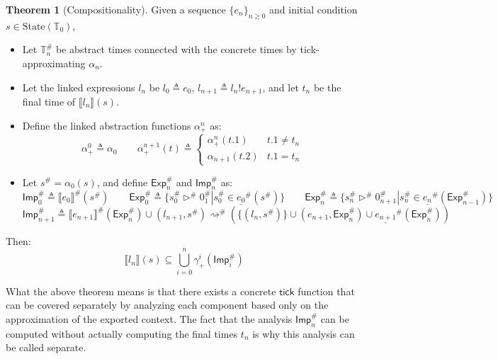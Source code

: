 \documentclass[acmsmall,review]{acmart}\settopmatter{printfolios=true,printccs=false,printacmref=false}
\theoremstyle{definition}
\newtheorem{thm}{Theorem}[section]
\newcommand*{\A}[1]{{#1}^{\#}}
\newcommand*{\Time}{\mathbb{T}}
\newcommand*{\ATime}{\A{\Time}}
\newcommand*{\State}[1]{\text{State}({#1})}
\newcommand*{\link}[2]{{#1}\mathtt{!}{#2}}
\newcommand*{\Exp}{\mathsf{Exp}}
\newcommand*{\Imp}{\mathsf{Imp}}
\newcommand*{\sembracket}[1]{\lBrack{#1}\rBrack}
\newcommand*{\tick}{\mathsf{tick}}
\begin{document}
\begin{thm}[Compositionality]
  Given a sequence $\{e_n\}_{n\ge 0}$ and initial condition $s\in\State{\Time_0}$,

  \begin{itemize}
    \item Let $\ATime_n$ be abstract times connected with the concrete times by tick-approximating $\alpha_n$.
    \item Let the linked expressions $l_n$ be $l_0\triangleq e_0$, $l_{n+1}\triangleq\link{l_n}{e_{n+1}}$, and let $t_n$ be the final time of $\sembracket{l_n}(s)$.
    \item Define the linked abstraction functions $\alpha^{n}_+$ as:
          \[
            \alpha^0_+\triangleq\alpha_0
            \qquad
            \alpha^{n+1}_+(t)\triangleq
            \begin{cases}
              \alpha^n_+(t.1)   & t.1\neq t_n \\
              \alpha_{n+1}(t.2) & t.1=t_n
            \end{cases}
          \]
    \item Let $\A{s}=\alpha_0(s)$, and define $\A\Exp_n$ and $\A\Imp_n$ as:
          \[
            \A\Imp_0\triangleq\A{\sembracket{e_0}}(\A{s})\qquad
            \A\Exp_0\triangleq\{\A{s}_0\A\rhd\A{0}_1|\A{s}_0\in\A{\underline{e_0}}(\A{s})\}\qquad
            \A\Exp_{n}\triangleq\{\A{s}_n\A\rhd\A{0}_{n+1}|\A{s}_{n}\in\A{\underline{e_{n}}}(\A\Exp_{n-1})\}
          \]
          \[
            \A\Imp_{n+1}\triangleq\A{\sembracket{e_{n+1}}}(\A\Exp_n)\cup(l_{n+1},\A{s})\A\rightsquigarrow(\{(l_n,\A{s})\}\cup(e_{n+1},\A\Exp_n)\cup\A{\underline{e_{n+1}}}(\A\Exp_{n}))
          \]
  \end{itemize}

  Then:
  \[
    \sembracket{l_n}(s)\subseteq\bigcup_{i=0}^{n}{\gamma^i_+(\A\Imp_i)}
  \]
\end{thm}

What the above theorem means is that there exists a concrete $\tick$ function that can be covered separately by analyzing each component based only on the approximation of the exported context.
The fact that the analysis $\A\Imp_n$ can be computed without actually computing the final times $t_n$ is why this analysis can be called separate.


\end{document}
